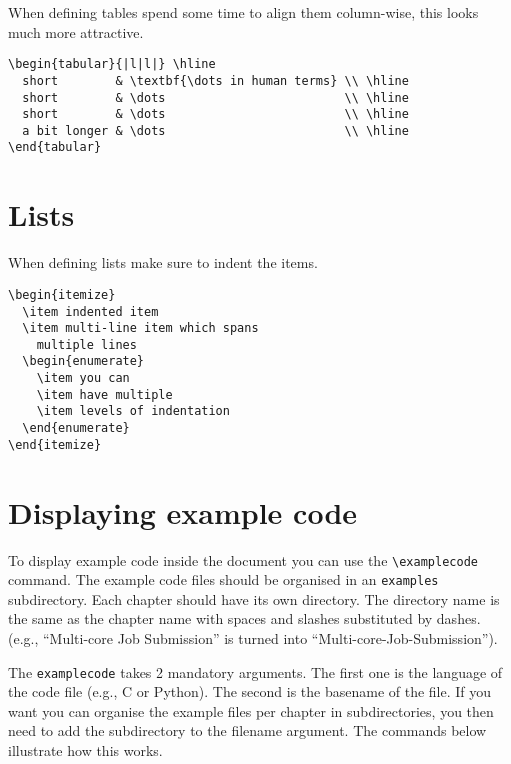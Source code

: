 \documentclass[11pt,a4paper]{article}
\begin{document}
When defining tables spend some time to align them column-wise, this looks much more attractive.

\begin{verbatim}
\begin{tabular}{|l|l|} \hline
  short        & \textbf{\dots in human terms} \\ \hline
  short        & \dots                         \\ \hline
  short        & \dots                         \\ \hline
  a bit longer & \dots                         \\ \hline
\end{tabular}
\end{verbatim}

\section{Lists}
\label{sec:lists}

When defining lists make sure to indent the items.

\begin{verbatim}
\begin{itemize}
  \item indented item
  \item multi-line item which spans
    multiple lines
  \begin{enumerate}
    \item you can
    \item have multiple
    \item levels of indentation
  \end{enumerate}
\end{itemize}
\end{verbatim}

\section{Displaying example code}
\label{sec:displaying-example-code}

To display example code inside the document you can use the \verb|\examplecode|
command. The example code files should be organised in an \lstinline|examples|
subdirectory.  Each chapter should have its own directory. The directory name
is the same as the chapter name with spaces and slashes substituted by dashes.
(e.g., ``Multi-core Job Submission'' is turned into
``Multi-core-Job-Submission'').

The \lstinline|examplecode| takes 2 mandatory arguments. The first one is the
language of the code file (e.g., C or Python). The second is the basename of the
file. If you want you can organise the example files per chapter in
subdirectories, you then need to add the subdirectory to the filename argument.
The commands below illustrate how this works.
\end{document}
